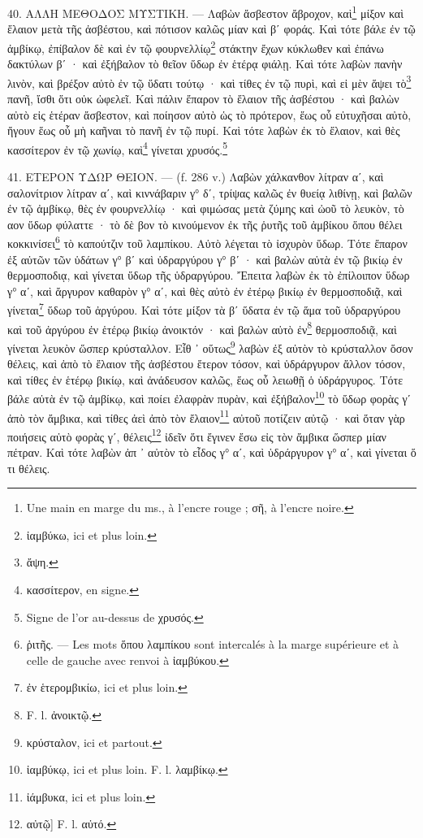 \documentclass[a4paper, 11pt, oneside, polutonikogreek, french]{article}
\begin{document}
40. ΑΛΛΗ ΜΕΘΟΔΟΣ ΜΥΣΤΙΚΗ. --- Λαβὼν ἄσβεστον ἄβροχον, καὶ\footnote{Une main en marge du ms., à l'encre rouge ; σῆ, à l'encre noire.} μίξον καὶ ἔλαιον μετὰ τῆς ἀσβέστου, καὶ πότισον καλῶς μίαν καὶ βʹ φοράς. Καὶ τότε βάλε ἐν τῷ ἀμβίκῳ, ἐπίβαλον δὲ καὶ ἐν τῷ φουρνελλίῳ\footnote{ἰαμβύκω, ici et plus loin.} στάκτην ἔχων κύκλωθεν καὶ ἐπάνω δακτύλων βʹ · καὶ ἐξήβαλον τὸ θεῖον ὕδωρ ἐν ἑτέρᾳ φιάλῃ. Καὶ τότε λαβὼν πανὴν λινὸν, καὶ βρέξον αὐτὸ ἐν τῷ ὕδατι τούτῳ · καὶ τίθες ἐν τῷ πυρὶ, καὶ εἰ μὲν ἅψει τὸ\footnote{ἄψη.} πανῆ, ἴσθι ὅτι οὐκ ὠφελεῖ. Καὶ πάλιν ἔπαρον τὸ ἔλαιον τῆς ἀσβέστου · καὶ βαλὼν αὐτὸ εἰς ἑτέραν ἄσβεστον, καὶ ποίησον αὐτὸ ὡς τὸ πρότερον, ἕως οὗ εὐτυχῆσαι αὐτὸ, ἤγουν ἕως οὗ μὴ καῆναι τὸ πανῆ ἐν τῷ πυρί. Καὶ τότε λαβὼν ἐκ τὸ ἔλαιον, καὶ θὲς κασσίτερον ἐν τῷ χωνίῳ, καὶ\footnote{κασσίτερον, en signe.} γίνεται χρυσός.\footnote{Signe de l'or au-dessus de χρυσός.}

41. ΕΤΕΡΟΝ ΥΔΩΡ ΘΕΙΟΝ. --- (f. 286 v.) Λαβὼν χάλκανθον λίτραν αʹ, καὶ σαλονίτριον λίτραν αʹ, καὶ κιννάβαριν γ° δʹ, τρίψας καλῶς ἐν θυείᾳ λιθίνῃ, καὶ βαλῶν ἐν τῷ ἀμβίκῳ, θὲς ἐν φουρνελλίῳ · καὶ φιμώσας μετὰ ζύμης καὶ ὠοῦ τὸ λευκὸν, τὸ αον ὕδωρ φύλαττε · τὸ δὲ βον τὸ κινούμενον ἐκ τῆς ῥυτῆς τοῦ ἀμβίκου ὅπου θέλει κοκκινίσει\footnote{ῥιτῆς. --- Les mots ὅπου λαμπίκου sont intercalés à la marge supérieure et à celle de gauche avec renvoi à ἰαμβύκου.} τὸ καπούτζιν τοῦ λαμπίκου. Αὐτὸ λέγεται τὸ ἰσχυρὸν ὕδωρ. Τότε ἔπαρον ἐξ αὐτῶν τῶν ὑδάτων γ° βʹ καὶ ὑδραργύρου γ° βʹ · καὶ βαλὼν αὐτὰ ἐν τῷ βικίῳ ἐν θερμοσποδιᾳ, καὶ γίνεται ὕδωρ τῆς ὑδραργύρου. Ἔπειτα λαβὼν ἐκ τὸ ἐπίλοιπον ὕδωρ γ° αʹ, καὶ ἄργυρον καθαρὸν γ° αʹ, καὶ θὲς αὐτὸ ἐν ἐτέρῳ βικίῳ ἐν θερμοσποδιᾷ, καὶ γίνεται\footnote{ἐν ἑτερομβικίω, ici et plus loin.} ὕδωρ τοῦ ἀργύρου. Καὶ τότε μίξον τὰ βʹ ὕδατα ἐν τῷ ἅμα τοῦ ὑδραργύρου καὶ τοῦ ἀργύρου ἐν ἑτέρῳ βικίῳ ἀνοικτόν · καὶ βαλὼν αὐτὸ ἐν\footnote{F. l. ἀνοικτῷ.} θερμοσποδιᾷ, καὶ γίνεται λευκὸν ὥσπερ κρύσταλλον. Εἶθ ᾽ οὕτως\footnote{κρύσταλον, ici et partout.} λαβὼν ἐξ αὐτὸν τὸ κρύσταλλον ὅσον θέλεις, καὶ ἀπὸ τὸ ἔλαιον τῆς ἀσβέστου ἕτερον τόσον, καὶ ὑδράργυρον ἄλλον τόσον, καὶ τίθες ἐν ἑτέρῳ βικίῳ, καὶ ἀνάδευσον καλῶς, ἕως οὗ λειωθῇ ὁ ὑδράργυρος. Τότε βάλε αὐτὰ ἐν τῷ ἀμβίκῳ, καὶ ποίει ἐλαφρὰν πυρὰν, καὶ ἐξήβαλον\footnote{ἰαμβύκῳ, ici et plus loin. F. l. λαμβίκῳ.} τὸ ὕδωρ φορὰς γʹ ἀπὸ τὸν ἄμβικα, καὶ τίθες ἀεὶ ἀπὸ τὸν ἔλαιον\footnote{ἰάμβυκα, ici et plus loin.} αὐτοῦ ποτίζειν αὐτῷ · καὶ ὅταν γὰρ ποιήσεις αὐτὸ φορὰς γʹ, θέλεις\footnote{αὐτῷ] F. l. αὐτό.} ἰδεῖν ὅτι ἔγινεν ἔσω εἰς τὸν ἄμβικα ὥσπερ μίαν πέτραν. Καὶ τότε λαβὼν ἀπ ᾽ αὐτὸν τὸ εἶδος γ° αʹ, καὶ ὑδράργυρον γ° αʹ, καὶ γίνεται ὅ τι θέλεις.
\end{document}
